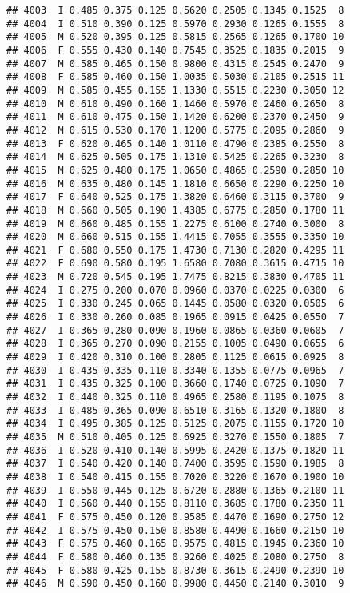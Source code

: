 \documentclass[
]{article}
\begin{document}
\begin{verbatim}
## 4003  I 0.485 0.375 0.125 0.5620 0.2505 0.1345 0.1525  8
## 4004  I 0.510 0.390 0.125 0.5970 0.2930 0.1265 0.1555  8
## 4005  M 0.520 0.395 0.125 0.5815 0.2565 0.1265 0.1700 10
## 4006  F 0.555 0.430 0.140 0.7545 0.3525 0.1835 0.2015  9
## 4007  M 0.585 0.465 0.150 0.9800 0.4315 0.2545 0.2470  9
## 4008  F 0.585 0.460 0.150 1.0035 0.5030 0.2105 0.2515 11
## 4009  M 0.585 0.455 0.155 1.1330 0.5515 0.2230 0.3050 12
## 4010  M 0.610 0.490 0.160 1.1460 0.5970 0.2460 0.2650  8
## 4011  M 0.610 0.475 0.150 1.1420 0.6200 0.2370 0.2450  9
## 4012  M 0.615 0.530 0.170 1.1200 0.5775 0.2095 0.2860  9
## 4013  F 0.620 0.465 0.140 1.0110 0.4790 0.2385 0.2550  8
## 4014  M 0.625 0.505 0.175 1.1310 0.5425 0.2265 0.3230  8
## 4015  M 0.625 0.480 0.175 1.0650 0.4865 0.2590 0.2850 10
## 4016  M 0.635 0.480 0.145 1.1810 0.6650 0.2290 0.2250 10
## 4017  F 0.640 0.525 0.175 1.3820 0.6460 0.3115 0.3700  9
## 4018  M 0.660 0.505 0.190 1.4385 0.6775 0.2850 0.1780 11
## 4019  M 0.660 0.485 0.155 1.2275 0.6100 0.2740 0.3000  8
## 4020  M 0.660 0.515 0.155 1.4415 0.7055 0.3555 0.3350 10
## 4021  F 0.680 0.550 0.175 1.4730 0.7130 0.2820 0.4295 11
## 4022  F 0.690 0.580 0.195 1.6580 0.7080 0.3615 0.4715 10
## 4023  M 0.720 0.545 0.195 1.7475 0.8215 0.3830 0.4705 11
## 4024  I 0.275 0.200 0.070 0.0960 0.0370 0.0225 0.0300  6
## 4025  I 0.330 0.245 0.065 0.1445 0.0580 0.0320 0.0505  6
## 4026  I 0.330 0.260 0.085 0.1965 0.0915 0.0425 0.0550  7
## 4027  I 0.365 0.280 0.090 0.1960 0.0865 0.0360 0.0605  7
## 4028  I 0.365 0.270 0.090 0.2155 0.1005 0.0490 0.0655  6
## 4029  I 0.420 0.310 0.100 0.2805 0.1125 0.0615 0.0925  8
## 4030  I 0.435 0.335 0.110 0.3340 0.1355 0.0775 0.0965  7
## 4031  I 0.435 0.325 0.100 0.3660 0.1740 0.0725 0.1090  7
## 4032  I 0.440 0.325 0.110 0.4965 0.2580 0.1195 0.1075  8
## 4033  I 0.485 0.365 0.090 0.6510 0.3165 0.1320 0.1800  8
## 4034  I 0.495 0.385 0.125 0.5125 0.2075 0.1155 0.1720 10
## 4035  M 0.510 0.405 0.125 0.6925 0.3270 0.1550 0.1805  7
## 4036  I 0.520 0.410 0.140 0.5995 0.2420 0.1375 0.1820 11
## 4037  I 0.540 0.420 0.140 0.7400 0.3595 0.1590 0.1985  8
## 4038  I 0.540 0.415 0.155 0.7020 0.3220 0.1670 0.1900 10
## 4039  I 0.550 0.445 0.125 0.6720 0.2880 0.1365 0.2100 11
## 4040  I 0.560 0.440 0.155 0.8110 0.3685 0.1780 0.2350 11
## 4041  F 0.575 0.450 0.120 0.9585 0.4470 0.1690 0.2750 12
## 4042  I 0.575 0.450 0.150 0.8580 0.4490 0.1660 0.2150 10
## 4043  F 0.575 0.460 0.165 0.9575 0.4815 0.1945 0.2360 10
## 4044  F 0.580 0.460 0.135 0.9260 0.4025 0.2080 0.2750  8
## 4045  F 0.580 0.425 0.155 0.8730 0.3615 0.2490 0.2390 10
## 4046  M 0.590 0.450 0.160 0.9980 0.4450 0.2140 0.3010  9

\end{verbatim}
\end{document}

